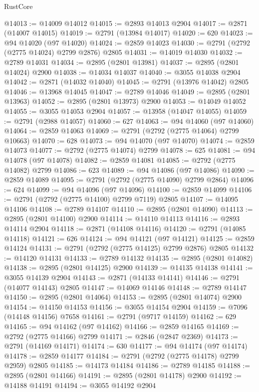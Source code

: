 \begin{lexlean}{RustCore}
\begin{coremodule}
@14013 := @14009 @14012
@14015 := @2893 @14013 @2904
@14017 := @2871 (@14007 @14015)
@14019 := @2791 (@13984 @14017)
@14020 := 620
@14023 := @94 @14020 (@97 @14020)
@14024 := @2859 @14023
@14030 := @2791 (@2792 (@2775 @14024) @2799 @2876) @2805
@14031 := @14019 @14030
@14032 := @2789 @14031
@14034 := @2895 (@2801 @13981)
@14037 := @2895 (@2801 @14024) @2900
@14038 := @14034 @14037
@14040 := @3055 @14038 @2904
@14042 := @2871 (@14032 @14040)
@14045 := @2791 (@13976 @14042) @2805
@14046 := @13968 @14045
@14047 := @2789 @14046
@14049 := @2895 (@2801 @13963)
@14052 := @2895 (@2801 @13973) @2900
@14053 := @14049 @14052
@14055 := @3055 @14053 @2904
@14057 := @13958 (@14047 @14055)
@14059 := @2791 (@2988 @14057)
@14060 := 627
@14063 := @94 @14060 (@97 @14060)
@14064 := @2859 @14063
@14069 := @2791 (@2792 (@2775 @14064) @2799 @10663)
@14070 := 628
@14073 := @94 @14070 (@97 @14070)
@14074 := @2859 @14073
@14077 := @2792 (@2775 @14074) @2799
@14078 := 625
@14081 := @94 @14078 (@97 @14078)
@14082 := @2859 @14081
@14085 := @2792 (@2775 @14082) @2799
@14086 := 623
@14089 := @94 @14086 (@97 @14086)
@14090 := @2859 @14089
@14095 := @2791 (@2792 (@2775 @14090) @2799 @2864)
@14096 := 624
@14099 := @94 @14096 (@97 @14096)
@14100 := @2859 @14099
@14106 := @2791 (@2792 (@2775 @14100) @2799 @7119) @2805
@14107 := @14095 @14106
@14108 := @2789 @14107
@14110 := @2895 (@2801 @14090)
@14113 := @2895 (@2801 @14100) @2900
@14114 := @14110 @14113
@14116 := @2893 @14114 @2904
@14118 := @2871 (@14108 @14116)
@14120 := @2791 (@14085 @14118)
@14121 := 626
@14124 := @94 @14121 (@97 @14121)
@14125 := @2859 @14124
@14131 := @2791 (@2792 (@2775 @14125) @2799 @2876) @2805
@14132 := @14120 @14131
@14133 := @2789 @14132
@14135 := @2895 (@2801 @14082)
@14138 := @2895 (@2801 @14125) @2900
@14139 := @14135 @14138
@14141 := @3055 @14139 @2904
@14143 := @2871 (@14133 @14141)
@14146 := @2791 (@14077 @14143) @2805
@14147 := @14069 @14146
@14148 := @2789 @14147
@14150 := @2895 (@2801 @14064)
@14153 := @2895 (@2801 @14074) @2900
@14154 := @14150 @14153
@14156 := @3055 @14154 @2904
@14159 := @7096 (@14148 @14156) @7658
@14161 := @2791 (@9717 @14159)
@14162 := 629
@14165 := @94 @14162 (@97 @14162)
@14166 := @2859 @14165
@14169 := @2792 (@2775 @14166) @2799
@14171 := @2846 (@2847 @2369)
@14173 := @2791 (@14169 @14171)
@14174 := 630
@14177 := @94 @14174 (@97 @14174)
@14178 := @2859 @14177
@14184 := @2791 (@2792 (@2775 @14178) @2799 @2959) @2805
@14185 := @14173 @14184
@14186 := @2789 @14185
@14188 := @2895 (@2801 @14166)
@14191 := @2895 (@2801 @14178) @2900
@14192 := @14188 @14191
@14194 := @3055 @14192 @2904

\end{coremodule}
\end{lexlean}
